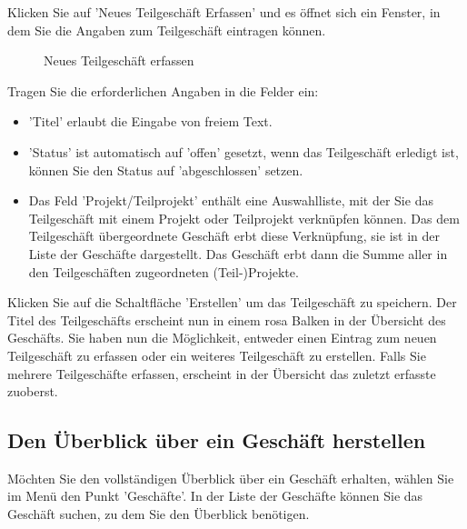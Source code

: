 Klicken Sie auf 'Neues Teilgeschäft Erfassen' und es öffnet sich ein Fenster, in dem Sie die Angaben zum Teilgeschäft eintragen können.

\begin{figure}[H]
\caption{Neues Teilgeschäft erfassen}
\end{figure}

Tragen Sie die erforderlichen Angaben in die Felder ein:

\begin{itemize}
\item
'Titel'  erlaubt die Eingabe von freiem Text.
\item
'Status'  ist automatisch auf 'offen' gesetzt, wenn das Teilgeschäft erledigt ist, können Sie den Status auf 'abgeschlossen' setzen.
\item
Das Feld 'Projekt/Teilprojekt'  enthält eine Auswahlliste, mit der Sie das Teilgeschäft mit einem Projekt oder Teilprojekt verknüpfen können. Das dem Teilgeschäft übergeordnete Geschäft erbt diese Verknüpfung, sie ist in der Liste der Geschäfte dargestellt. Das Geschäft erbt dann die Summe aller in den Teilgeschäften zugeordneten (Teil-)Projekte.
\end{itemize}

Klicken Sie auf die Schaltfläche 'Erstellen'  um das Teilgeschäft zu speichern. Der Titel des Teilgeschäfts erscheint nun in einem rosa Balken in der Übersicht des Geschäfts. Sie haben nun die Möglichkeit, entweder einen Eintrag zum neuen Teilgeschäft zu erfassen oder ein weiteres Teilgeschäft zu erstellen. Falls Sie mehrere Teilgeschäfte erfassen, erscheint in der Übersicht das zuletzt erfasste zuoberst.

\subsection{Den Überblick über ein Geschäft herstellen}

Möchten Sie den vollständigen Überblick über ein Geschäft erhalten, wählen Sie im Menü den Punkt 'Geschäfte'. In der Liste der Geschäfte können Sie das Geschäft suchen, zu dem Sie den Überblick benötigen.

